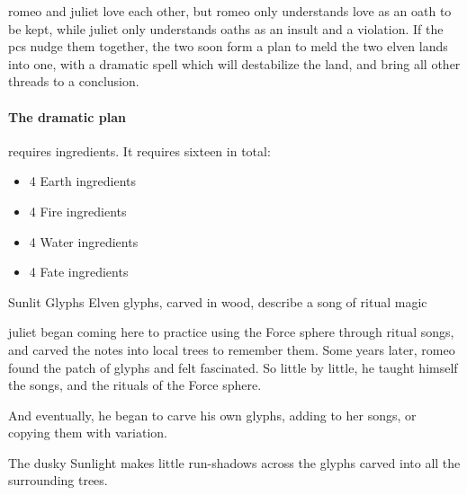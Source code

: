 
\Gls{romeo} and \gls{juliet} love each other, but \gls{romeo} only understands love as an oath to be kept, while \gls{juliet} only understands oaths as an insult and a violation.
If the \glspl{pc} nudge them together, the two soon form a plan to meld the two elven lands into one, with a dramatic spell which will destabilize the land, and bring all other threads to a conclusion.

\paragraph{The dramatic plan}
requires \glspl{ingredient}.
It requires sixteen in total:

\begin{itemize}
  \item
  4 Earth \glspl{ingredient}
  \item
  4 Fire \glspl{ingredient}
  \item
  4 Water \glspl{ingredient}
  \item
  4 Fate \glspl{ingredient}
\end{itemize}

{Sunlit Glyphs}%
{Elven glyphs, carved in wood, describe a song of ritual magic}%

\begin{exampletext}
  \Gls{juliet} began coming here to practice using the Force \gls{sphere} through ritual songs, and carved the notes into local trees to remember them.
  Some years later, \gls{romeo} found the patch of glyphs and felt fascinated.
  So little by little, he taught himself the songs, and the rituals of the Force \gls{sphere}.

  And eventually, he began to carve his own glyphs, adding to her songs, or copying them with variation.
\end{exampletext}



\begin{boxtext}
  The dusky Sunlight makes little run-shadows across the glyphs carved into all the surrounding trees.
\end{boxtext}


